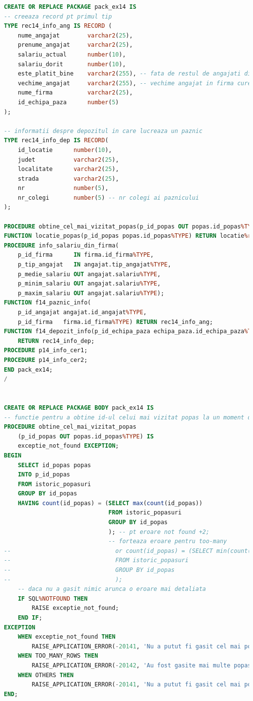 \documentclass[12pt, a4paper]{article}
\begin{document}
\begin{lstlisting}[language=SQL]
CREATE OR REPLACE PACKAGE pack_ex14 IS
-- creeaza record pt primul tip
TYPE rec14_info_ang IS RECORD (
    nume_angajat        varchar2(25),
    prenume_angajat     varchar2(25),
    salariu_actual      number(10),
    salariu_dorit       number(10),
    este_platit_bine    varchar2(255), -- fata de restul de angajati din firma
    vechime_angajat     varchar2(255), -- vechime angajat in firma curenta
    nume_firma          varchar2(25),
    id_echipa_paza      number(5)
);

-- informatii despre depozitul in care lucreaza un paznic
TYPE rec14_info_dep IS RECORD(
    id_locatie      number(10),
    judet           varchar2(25),
    localitate      varchar2(25),
    strada          varchar2(25),
    nr              number(5),
    nr_colegi       number(5) -- nr colegi ai paznicului
);

PROCEDURE obtine_cel_mai_vizitat_popas(p_id_popas OUT popas.id_popas%TYPE);
FUNCTION locatie_popas(p_id_popas popas.id_popas%TYPE) RETURN locatie%rowtype;
PROCEDURE info_salariu_din_firma(
    p_id_firma      IN firma.id_firma%TYPE,
    p_tip_angajat   IN angajat.tip_angajat%TYPE,
    p_medie_salariu OUT angajat.salariu%TYPE,
    p_minim_salariu OUT angajat.salariu%TYPE,
    p_maxim_salariu OUT angajat.salariu%TYPE);
FUNCTION f14_paznic_info(
    p_id_angajat angajat.id_angajat%TYPE,
    p_id_firma   firma.id_firma%TYPE) RETURN rec14_info_ang;
FUNCTION f14_depozit_info(p_id_echipa_paza echipa_paza.id_echipa_paza%TYPE)
    RETURN rec14_info_dep;
PROCEDURE p14_info_cer1;
PROCEDURE p14_info_cer2;
END pack_ex14;
/


CREATE OR REPLACE PACKAGE BODY pack_ex14 IS
-- functie pentru a obtine id-ul celui mai vizitat popas la un moment dat
PROCEDURE obtine_cel_mai_vizitat_popas
    (p_id_popas OUT popas.id_popas%TYPE) IS
    exceptie_not_found EXCEPTION;
BEGIN
    SELECT id_popas popas
    INTO p_id_popas
    FROM istoric_popasuri
    GROUP BY id_popas
    HAVING count(id_popas) = (SELECT max(count(id_popas))
                              FROM istoric_popasuri
                              GROUP BY id_popas
                              ); -- pt eroare not found +2;
                              -- forteaza eroare pentru too-many
--                              or count(id_popas) = (SELECT min(count(id_popas))
--                              FROM istoric_popasuri
--                              GROUP BY id_popas
--                              ); 
    -- daca nu a gasit nimic arunca o eroare mai detaliata
    IF SQL%NOTFOUND THEN
        RAISE exceptie_not_found;
    END IF;
EXCEPTION
    WHEN exceptie_not_found THEN
        RAISE_APPLICATION_ERROR(-20141, 'Nu a putut fi gasit cel mai popular popas!');
    WHEN TOO_MANY_ROWS THEN
        RAISE_APPLICATION_ERROR(-20142, 'Au fost gasite mai multe popasuri la fel de vizitate!');
    WHEN OTHERS THEN
        RAISE_APPLICATION_ERROR(-20141, 'Nu a putut fi gasit cel mai popular popas!');
END;


\end{lstlisting}
\end{document}
